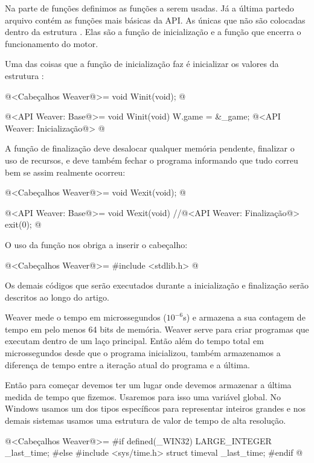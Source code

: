Na parte de funções definimos as funções a serem usadas. Já a última
partedo arquivo contém as funções mais básicas da API. As únicas que
não são colocadas dentro da estrutura . Elas são a
função de inicialização e a função que encerra o funcionamento do
motor.


Uma das coisas que a função de inicialização faz é inicializar os
valores da estrutura :

\iniciocodigo
@<Cabeçalhos Weaver@>=
void Winit(void);
@
\fimcodigo

\iniciocodigo
@<API Weaver: Base@>=
void Winit(void){
  W.game = &_game;
  @<API Weaver: Inicialização@>
}
@
\fimcodigo

A função de finalização deve desalocar qualquer memória pendente,
finalizar o uso de recursos, e deve também fechar o programa
informando que tudo correu bem se assim realmente ocorreu:

\iniciocodigo
@<Cabeçalhos Weaver@>=
void Wexit(void);
@
\fimcodigo

\iniciocodigo
@<API Weaver: Base@>=
void Wexit(void){
  //@<API Weaver: Finalização@>
  exit(0);
}
@
\fimcodigo

O uso da função  nos obriga a inserir o cabeçalho:

\iniciocodigo
@<Cabeçalhos Weaver@>=
#include <stdlib.h>
@
\fimcodigo

Os demais códigos que serão executados durante a inicialização e
finalização serão descritos ao longo do artigo.


Weaver mede o tempo em microssegundos ($10^{-6}$s) e armazena a sua
contagem de tempo em pelo menos 64 bits de memória. Weaver serve para
criar programas que executam dentro de um laço principal. Então além
do tempo total em microssegundos desde que o programa inicializou,
também armazenamos a diferença de tempo entre a iteração atual do
programa e a última.

Então para começar devemos ter um lugar onde devemos armazenar a
última medida de tempo que fizemos. Usaremos para isso uma variável
global. No Windows usamos um dos tipos específicos para representar
inteiros grandes e nos demais sistemas usamos uma estrutura de valor
de tempo de alta resolução.

\iniciocodigo
@<Cabeçalhos Weaver@>=
#if defined(_WIN32)
LARGE_INTEGER _last_time;
#else
#include <sys/time.h>
struct timeval _last_time;
#endif
@
\fimcodigo

